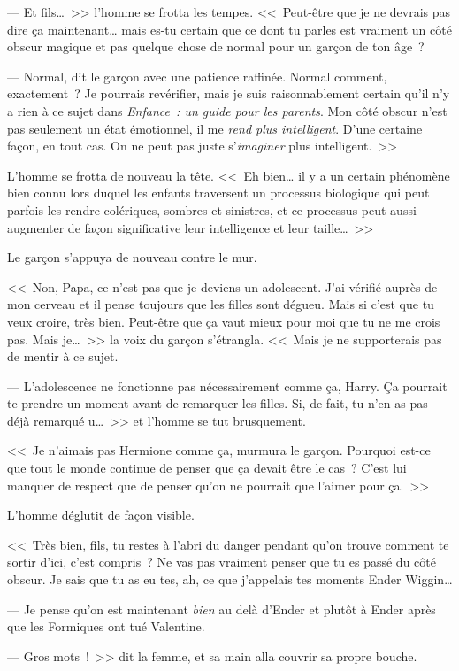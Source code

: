 --- Et fils…~>> l'homme se frotta les tempes. <<~Peut-être que je ne devrais pas dire ça maintenant… mais es-tu certain que ce dont tu parles est vraiment un côté obscur magique et pas quelque chose de normal pour un garçon de ton âge~?

--- Normal, dit le garçon avec une patience raffinée. Normal comment, exactement~? Je pourrais revérifier, mais je suis raisonnablement certain qu'il n'y a rien à ce sujet dans \emph{Enfance~: un guide pour les parents}. Mon côté obscur n'est pas seulement un état émotionnel, il me \emph{rend plus intelligent}. D'une certaine façon, en tout cas. On ne peut pas juste s'\emph{imaginer} plus intelligent.~>>

L'homme se frotta de nouveau la tête. <<~Eh bien… il y a un certain phénomène bien connu lors duquel les enfants traversent un processus biologique qui peut parfois les rendre colériques, sombres et sinistres, et ce processus peut aussi augmenter de façon significative leur intelligence et leur taille…~>>

Le garçon s'appuya de nouveau contre le mur.

<<~Non, Papa, ce n'est pas que je deviens un adolescent. J'ai vérifié auprès de mon cerveau et il pense toujours que les filles sont dégueu. Mais si c'est que tu veux croire, très bien. Peut-être que ça vaut mieux pour moi que tu ne me crois pas. Mais je…~>> la voix du garçon s'étrangla. <<~Mais je ne supporterais pas de mentir à ce sujet.

--- L'adolescence ne fonctionne pas nécessairement comme ça, Harry. Ça pourrait te prendre un moment avant de remarquer les filles. Si, de fait, tu n'en as pas déjà remarqué u…~>> et l'homme se tut brusquement.

<<~Je n'aimais pas Hermione comme ça, murmura le garçon. Pourquoi est-ce que tout le monde continue de penser que ça devait être le cas~? C'est lui manquer de respect que de penser qu'on ne pourrait que l'aimer pour ça.~>>

L'homme déglutit de façon visible.

<<~Très bien, fils, tu restes à l'abri du danger pendant qu'on trouve comment te sortir d'ici, c'est compris~? Ne vas pas vraiment penser que tu es passé du côté obscur. Je sais que tu as eu tes, ah, ce que j'appelais tes moments Ender Wiggin…

--- Je pense qu'on est maintenant \emph{bien} au delà d'Ender et plutôt à Ender après que les Formiques ont tué Valentine.

--- Gros mots~!~>> dit la femme, et sa main alla couvrir sa propre bouche.

